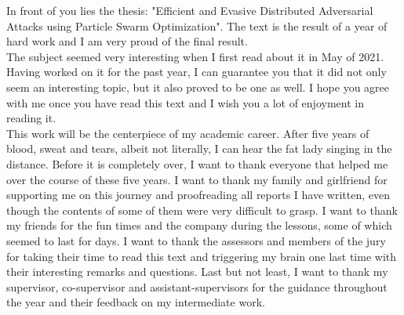 \begin{preface}
In front of you lies the thesis: "Efficient and Evasive Distributed Adversarial Attacks using Particle Swarm Optimization". The text is the result of a year of hard work and I am very proud of the final result.\\

The subject seemed very interesting when I first read about it in May of 2021. Having worked on it for the past year, I can guarantee you that it did not only seem an interesting topic, but it also proved to be one as well. I hope you agree with me once you have read this text and I wish you a lot of enjoyment in reading it.\\
 
This work will be the centerpiece of my academic career. After five years of blood, sweat and tears, albeit not literally, I can hear the fat lady singing in the distance. Before it is completely over, I want to thank everyone that helped me over the course of these five years. I want to thank my family and girlfriend for supporting me on this journey and proofreading all reports I have written, even though the contents of some of them were very difficult to grasp. I want to thank my friends for the fun times and the company during the lessons, some of which seemed to last for days. I want to thank the assessors and members of the jury for taking their time to read this text and triggering my brain one last time with their interesting remarks and questions. Last but not least, I want to thank my supervisor, co-supervisor and assistant-supervisors for the guidance throughout the year and their feedback on my intermediate work.\\
\end{preface}